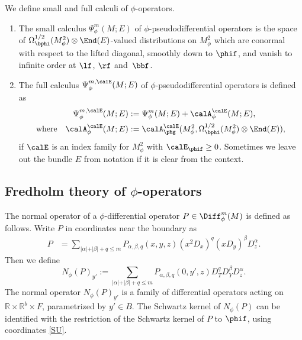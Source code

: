 \begin{defn}\label{phi-calculus-basic} We define small and full calculi of $\phi$-operators.
\begin{enumerate}
\item
The small calculus $\Psi_\phi^m(M; E)$ of $\phi$-pseudodifferential operators is the
space of $\Omega^{1/2}_{\bphi}(M^2_\phi) \otimes \End(E)$-valued
distributions on $M^2_\phi$ which are conormal with
respect to the lifted diagonal, smoothly down to $\phif$, and vanish to infinite order at $\lf$, $\rf$ and~$\bbf$.
\item
The full calculus $\Psi_\phi^{m,\calE}(M; E)$ of $\phi$-pseudodifferential operators is defined as
\begin{align*}
\Psi_\phi^{m,\calE}(M; E) &:= \Psi_\phi^{m}(M; E) + \calA_{\phi}^\calE(M;E), \\
\text{where} \quad \calA_{\phi}^\calE(M;E)&:= \calA_{\phg}^\calE(M^2_\phi,
\Omega^{1/2}_{\bphi}(M^2_\phi) \otimes \End(E)),
\end{align*}
if $\calE$ is an index family for $M^2_\phi$ with $\calE_{\phif}\geq 0$.
Sometimes we leave out the bundle $E$ from notation if it is clear from the context.
\end{enumerate}
\end{defn}

\subsection{Fredholm theory of \texorpdfstring{$\phi$}{phi}-operators}\label{normal op}
The normal operator of a $\phi$-differential operator
$P \in \Diff_{\phi}^{m}(M)$ is defined as follows. Write $P$ in coordinates near the boundary as
\begin{align*}
P &= \sum_{\vert \alpha \vert + \vert \beta \vert + q \leq m}
P_{\alpha,\beta,q}(x,y,z)(x^{2}D_{x})^{q}(xD_{y})^\beta D_{z}^{\alpha}.
\end{align*}
Then we define
\begin{equation}
\label{eqn:normal family def}
N_{\phi}(P)_{y'} :=
\sum_{\vert \alpha \vert + \vert \beta \vert + q \leq m}
P_{\alpha,\beta,q}(0,y',z) D^q_T D^\beta_Y D_{z}^{\alpha}.
\end{equation}
The normal operator $N_{\phi}(P)_{y'}$ is a family of differential operators acting on
$\mathbb{R}\times\mathbb{R}^{b}\times F$, parametrized by $y'\in B$. The Schwartz kernel of $N_\phi(P)$ can be identified with the restriction of the Schwartz kernel of $P$ to $\phif$, using coordinates \eqref{SU}.

